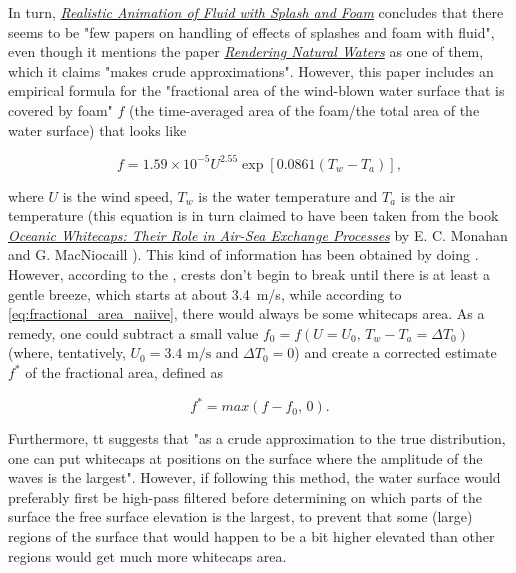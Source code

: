 In turn, \textit{\href{http://nguyendangbinh.org/Proceedings/Eurographics/2003/cgf/volume22/issue3/paper127/paper127.pdf}{Realistic Animation of Fluid with Splash and Foam}} \citep{temp} concludes that there seems to be "few papers on handling of effects of splashes and foam with fluid", even though it mentions the paper \textit{\href{https://subversion.assembla.com/svn/gpuocean/trunk/docs/rendering-natural-waters-00.pdf}{Rendering Natural Waters}} \citep{temp} as one of them, which it claims "makes crude approximations". However, this paper includes an empirical formula for the "fractional area of the wind-blown water surface that is covered by foam" $f$ (the time-averaged area of the foam/the total area of the water surface) that looks like

\begin{equation} \label{eq:fractional_area_naiive}
f = 1.59 \times 10^{-5}U^{2.55}\exp[0.0861(T_w - T_a)],
\end{equation}

where $U$ is the wind speed, $T_w$ is the water temperature and $T_a$ is the air temperature (this equation is in turn claimed to have been taken from the book \textit{\href{http://books.google.se/books?id=xuwFz1bPTHgC}{Oceanic Whitecaps: Their Role in Air-Sea Exchange Processes}} by E. C. Monahan and G. MacNiocaill \citep{temp}). This kind of information has been obtained by doing . However, according to the , crests don't begin to break until there is at least a gentle breeze, which starts at about \mbox{3.4 m/s}, while according to \eqref{eq:fractional_area_naiive}, there would always be some whitecaps area. As a remedy, one could subtract a small value ${f_0 = f(U=U_0,\, T_w-T_a=\Delta T_0)}$ (where, tentatively, ${U_0 = 3.4\text{ m/s}}$ and ${\Delta T_0 = 0}$) and create a corrected estimate $f^*$ of the fractional area, defined as

\begin{equation}
f^* = max(f-f_0,\,0).
\end{equation}

Furthermore, tt suggests that "as a crude approximation to the true distribution, one can put whitecaps at positions on the surface where the amplitude of the waves is the largest". However, if following this method, the water surface would preferably first be high-pass filtered before determining on which parts of the surface the free surface elevation is the largest, to prevent that some (large) regions of the surface that would happen to be a bit higher elevated than other regions would get much more whitecaps area.

